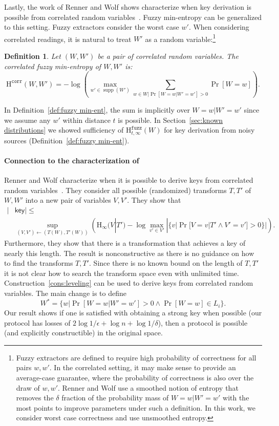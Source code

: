 \documentclass[11pt]{article}
\newtheorem{definition}[theorem]{Definition}
\newcommand{\supp}{\operatorname{supp}}
\newcommand{\secref}[1]{\mbox{Section~\ref{#1}}}
\newcommand{\defref}[1]{\mbox{Definition~\ref{#1}}}
\newcommand{\consref}[1]{\mbox{Construction~\ref{#1}}}
\newcommand{\class}[1]{{\ensuremath{\mathsf{#1}}}}
\newcommand{\key}{\ensuremath{\class{key}}\xspace}
\newcommand{\Hoo}{\mathrm{H}_\infty}
\newcommand{\Hfuzz}{\mathrm{H}^{\mathtt{fuzz}}_{t,\infty}}
\newcommand{\Hcorr}{\mathrm{H}^{\mathtt{corr}}}
\begin{document}
Lastly, the work of Renner and Wolf shows characterize when key derivation is possible from correlated random variables~\cite[Theorem 3]{DBLP:conf/asiacrypt/RennerW05}.  Fuzzy min-entropy can be generalized to this setting.   Fuzzy extractors consider the worst case $w'$.  When considering correlated readings, it is natural to treat $W'$ as a random variable:\footnote{Fuzzy extractors are defined to require high probability of correctness for all pairs $w, w'$.  In the correlated setting, it may make sense to provide an average-case guarantee, where the probability of correctness is also over the draw of $w, w'$.  Renner and Wolf use a smoothed notion of entropy that removes the $\delta$ fraction of the probability mass of $W=w|W'=w'$ with the most points to improve parameters under such a definition.  In this work, we consider worst case correctness and use unsmoothed entropy.}

\begin{definition}
\label{def:cor fuzz min}
Let $(W, W')$ be a pair of correlated random variables.  The correlated fuzzy min-entropy of $W, W'$ is:
\[\Hcorr(W, W') = -\log \left( \max_{w'\in \supp(W')}\sum_{w\in W | \Pr[W=w|W'=w']>0} \Pr[W = w] \right).\]
\end{definition}
\noindent 
In \defref{def:fuzzy min-ent}, the sum is implicitly over $W=w|W'=w'$ since we assume any $w'$ within distance $t$ is possible.  
In \secref{sec:known distributions} we showed sufficiency  of $\Hfuzz(W)$ for key derivation from noisy sources (\defref{def:fuzzy min-ent}). 

\paragraph{Connection to the characterization of~\cite{DBLP:conf/asiacrypt/RennerW05}}
Renner and Wolf characterize when it is possible to derive keys from correlated random variables~\cite[Theorem 3]{DBLP:conf/asiacrypt/RennerW05}.  They consider all possible (randomized) transforms $T, T'$ of $W, W'$ into a new pair of variables $V,V'$.  They show that 
\begin{align*}
|&\key|\le\\ &\sup_{(V, V')\leftarrow (T(W), T'(W))}\left(  \Hoo(V | T') - \log \max_{v'\in V'} |\{v| \Pr[V=v|T' \wedge V'=v']>0\}|\right).
\end{align*}
\noindent
Furthermore, they show that there is a transformation that achieves a key of nearly this length.  The result is nonconstructive as there is no guidance on how to find the transforms $T, T'$.  Since there is no known bound on the length of $T, T'$ it is not clear how to search the transform space even with unlimited time.
\consref{cons:leveling} can be used to derive keys from correlated random variables.  The main change is to define \[W^* = \{w | \Pr[W=w | W'=w'] >0 \wedge \Pr[W=w]\in L_i\}.\]  
Our result shows if one is satisfied with obtaining a strong key when possible (our protocol has losses of $2\log 1/\epsilon + \log n+\log 1/\delta$), then a protocol is possible (and explicitly constructible) in the original space. 
\end{document}
